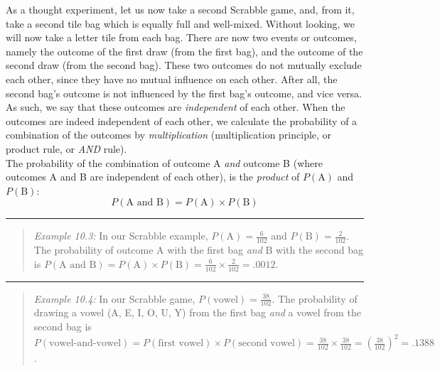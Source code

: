 \documentclass[
]{book}
\begin{document}
As a thought experiment, let us now take a second Scrabble game, and, from it, take
a second tile bag which is equally full and well-mixed.
Without looking, we will now take a letter tile from each bag. There are now two
events or outcomes, namely the outcome of the first draw (from the first
bag), and the outcome of the second draw (from the second bag).
These two outcomes do not mutually exclude each other, since they
have no mutual influence on each other. After all, the second
bag's outcome is not influenced by the first bag's outcome, and vice versa. As
such, we say that these outcomes are \emph{independent} of each other. When the outcomes
are indeed independent of each other, we calculate the probability of a
combination of the outcomes by \emph{multiplication} (multiplication
principle, or product rule, or \emph{AND} rule).\\
The probability of the combination of outcome A \emph{and} outcome B
(where outcomes A and B are independent of each other), is the
\emph{product} of \(P(\textrm{A})\) and \(P(\textrm{B})\):
\begin{equation}
    P(\textrm{A and B}) = P(\textrm{A}) \times P(\textrm{B})
  \label{eq:probability-productrule}
\end{equation}

\begin{center}\rule{0.5\linewidth}{0.5pt}\end{center}

\begin{quote}
\emph{Example 10.3:}
In our Scrabble example, \(P(\textrm{A})=\frac{6}{102}\) and
\(P(\textrm{B})=\frac{2}{102}\). The probability of outcome A with the first
bag \emph{and} B with the second bag is
\(P(\textrm{A and B})=P(\textrm{A}) \times P(\textrm{B})=\frac{6}{102} \times \frac{2}{102} = .0012\).
\end{quote}

\begin{center}\rule{0.5\linewidth}{0.5pt}\end{center}

\begin{quote}
\emph{Example 10.4:}
In our Scrabble game, \(P(\textrm{vowel})=\frac{38}{102}\). The probability
of drawing a vowel (A, E, I, O, U, Y) from the first bag \emph{and} a
vowel from the second bag is
\(P(\textrm{vowel-and-vowel})=P(\textrm{first vowel}) \times P(\textrm{second vowel})=\frac{38}{102} \times \frac{38}{102} = (\frac{38}{102})^2 = .1388\).
\end{quote}
\end{document}
